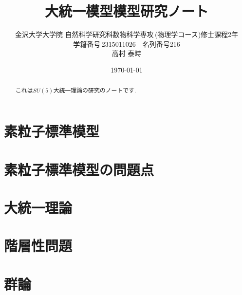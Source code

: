 \documentclass[titlepage]{jsbook}
\theoremstyle{plain}
\theoremstyle{definition}
\begin{document}
\title{大統一模型模型研究ノート}
\author{金沢大学大学院\,\,自然科学研究科数物科学専攻\,(物理学コース)修士課程2年\\学籍番号\,2315011026$\quad$名列番号216\\高村 泰時} 
\date{\today}
\maketitle

\begin{abstract}
  これは$SU(5)$大統一理論の研究のノートです.
\end{abstract}

\chapter{素粒子標準模型}


\chapter{素粒子標準模型の問題点}


\chapter{大統一理論}


\chapter{階層性問題}


\chapter{群論}





\end{document}

